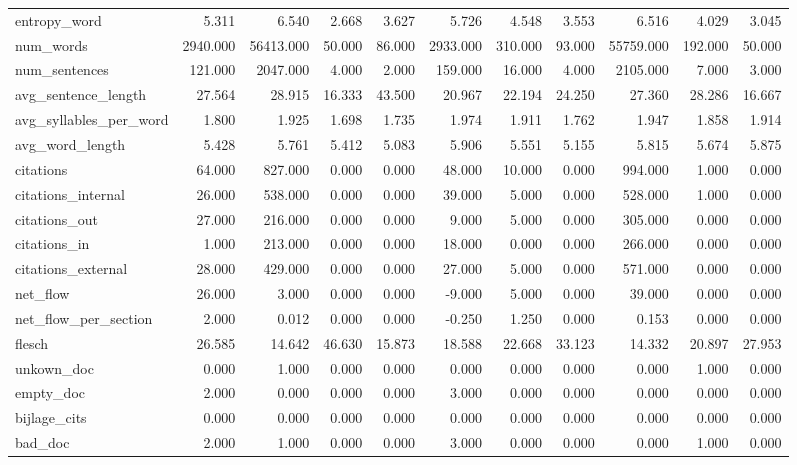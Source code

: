\begin{tabular}{lrrrrrrrrrr}
\cline{1-11}
entropy\_word & 5.311 & 6.540 & 2.668 & 3.627 & 5.726 & 4.548 & 3.553 & 6.516 & 4.029 & 3.045 \\
\cline{1-11}
num\_words & 2940.000 & 56413.000 & 50.000 & 86.000 & 2933.000 & 310.000 & 93.000 & 55759.000 & 192.000 & 50.000 \\
\cline{1-11}
num\_sentences & 121.000 & 2047.000 & 4.000 & 2.000 & 159.000 & 16.000 & 4.000 & 2105.000 & 7.000 & 3.000 \\
\cline{1-11}
avg\_sentence\_length & 27.564 & 28.915 & 16.333 & 43.500 & 20.967 & 22.194 & 24.250 & 27.360 & 28.286 & 16.667 \\
\cline{1-11}
avg\_syllables\_per\_word & 1.800 & 1.925 & 1.698 & 1.735 & 1.974 & 1.911 & 1.762 & 1.947 & 1.858 & 1.914 \\
\cline{1-11}
avg\_word\_length & 5.428 & 5.761 & 5.412 & 5.083 & 5.906 & 5.551 & 5.155 & 5.815 & 5.674 & 5.875 \\
\cline{1-11}
citations & 64.000 & 827.000 & 0.000 & 0.000 & 48.000 & 10.000 & 0.000 & 994.000 & 1.000 & 0.000 \\
\cline{1-11}
citations\_internal & 26.000 & 538.000 & 0.000 & 0.000 & 39.000 & 5.000 & 0.000 & 528.000 & 1.000 & 0.000 \\
\cline{1-11}
citations\_out & 27.000 & 216.000 & 0.000 & 0.000 & 9.000 & 5.000 & 0.000 & 305.000 & 0.000 & 0.000 \\
\cline{1-11}
citations\_in & 1.000 & 213.000 & 0.000 & 0.000 & 18.000 & 0.000 & 0.000 & 266.000 & 0.000 & 0.000 \\
\cline{1-11}
citations\_external & 28.000 & 429.000 & 0.000 & 0.000 & 27.000 & 5.000 & 0.000 & 571.000 & 0.000 & 0.000 \\
\cline{1-11}
net\_flow & 26.000 & 3.000 & 0.000 & 0.000 & -9.000 & 5.000 & 0.000 & 39.000 & 0.000 & 0.000 \\
\cline{1-11}
net\_flow\_per\_section & 2.000 & 0.012 & 0.000 & 0.000 & -0.250 & 1.250 & 0.000 & 0.153 & 0.000 & 0.000 \\
\cline{1-11}
flesch & 26.585 & 14.642 & 46.630 & 15.873 & 18.588 & 22.668 & 33.123 & 14.332 & 20.897 & 27.953 \\
\cline{1-11}
unkown\_doc & 0.000 & 1.000 & 0.000 & 0.000 & 0.000 & 0.000 & 0.000 & 0.000 & 1.000 & 0.000 \\
\cline{1-11}
empty\_doc & 2.000 & 0.000 & 0.000 & 0.000 & 3.000 & 0.000 & 0.000 & 0.000 & 0.000 & 0.000 \\
\cline{1-11}
bijlage\_cits & 0.000 & 0.000 & 0.000 & 0.000 & 0.000 & 0.000 & 0.000 & 0.000 & 0.000 & 0.000 \\
\cline{1-11}
bad\_doc & 2.000 & 1.000 & 0.000 & 0.000 & 3.000 & 0.000 & 0.000 & 0.000 & 1.000 & 0.000 \\
\cline{1-11}
\bottomrule
\end{tabular}
